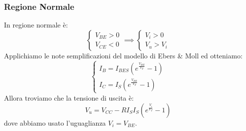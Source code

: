 \documentclass[../main.tex]{subfiles}
\begin{document}
	\subsubsection{Regione Normale}
	In regione normale è:
	$$\begin{cases} V_{BE} > 0 \\ V_{CE} < 0 \end{cases} \implies \begin{cases} V_i > 0 \\ V_u > V_i \end{cases}$$
	Applichiamo le note semplificazioni del modello di Ebers \& Moll ed otteniamo:
	$$\begin{cases} I_B = I_{BES} \left( e^{\frac{V_{BE}}{V_T}} - 1 \right) \\ I_C = I_S \left( e^{\frac{V_{BE}}{V_T}} - 1 \right) \end{cases}$$
	Allora troviamo che la tensione di uscita è:
	$$V_u = V_{CC} - RI_S I_S \left( e^{\frac{V_i}{V_T}} - 1 \right)$$
	dove abbiamo usato l’uguaglianza $V_i = V_{BE}$.
\end{document}
